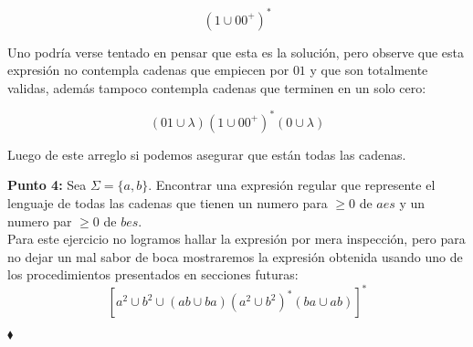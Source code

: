 \begin{itemize}
      $$(1\cup00^+)^*$$

      Uno podría verse tentado en pensar que esta es la solución, pero observe que esta expresión no contempla cadenas que empiecen por $01$ y que son totalmente validas, además tampoco contempla cadenas que terminen en un solo cero:

      $$(01\cup\lambda)(1\cup00^+)^*(0\cup\lambda)$$

      Luego de este arreglo si podemos asegurar que están todas las cadenas.
  
\end{itemize}

\textbf{Punto 4: }Sea $\Sigma=\{a,b\}$. Encontrar una expresión regular que represente el lenguaje de todas las cadenas que tienen un numero para $\geq0$ de $aes$ y un numero par $\geq0$ de $bes.$\\

Para este ejercicio no logramos hallar la expresión por mera inspección, pero para no dejar un mal sabor de boca mostraremos la expresión obtenida usando uno de los procedimientos presentados en secciones futuras:
$$[a^2\cup b^2\cup(ab\cup ba)(a^2\cup b^2)^*(ba\cup ab)]^*$$

\hfill $\blacklozenge$